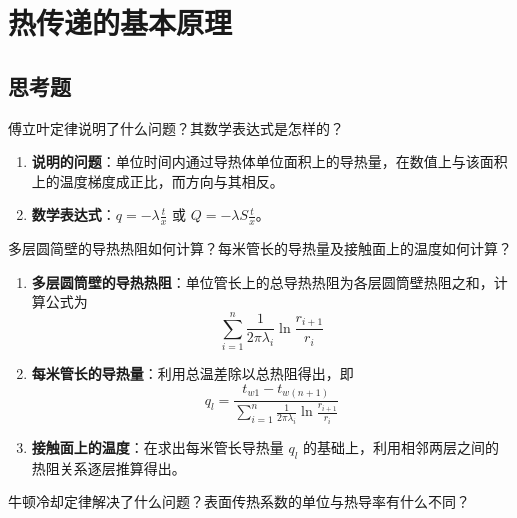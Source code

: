 \chapter{热传递的基本原理}

\section{思考题}

\begin{problem}
傅立叶定律说明了什么问题？其数学表达式是怎样的？
\end{problem}

\begin{solution}
\begin{enumerate}
  \item \textbf{说明的问题}：单位时间内通过导热体单位面积上的导热量，在数值上与该面积上的温度梯度成正比，而方向与其相反。
  \item \textbf{数学表达式}：\(q=-\lambda\frac{t}{x}\) 或 \(Q=-\lambda S\frac{t}{x}\)。
\end{enumerate}
\end{solution}

\begin{problem}
多层圆简壁的导热热阻如何计算？每米管长的导热量及接触面上的温度如何计算？
\end{problem}

\begin{solution}
\begin{enumerate}
  \item \textbf{多层圆筒壁的导热热阻}：单位管长上的总导热热阻为各层圆筒壁热阻之和，计算公式为
  \begin{equation*}
    \sum_{i=1}^{n}\frac{1}{2\pi\lambda_{i}}\ln\frac{r_{i+1}}{r_{i}}
  \end{equation*}
  \item \textbf{每米管长的导热量}：利用总温差除以总热阻得出，即
  \begin{equation*}
    q_{l}=\frac{t_{w1}-t_{w(n+1)}}{\sum_{i=1}^{n}\frac{1}{2\pi\lambda_{i}}\ln\frac{r_{i+1}}{r_{i}}}
  \end{equation*}
  \item \textbf{接触面上的温度}：在求出每米管长导热量 \(q_l\) 的基础上，利用相邻两层之间的热阻关系逐层推算得出。
\end{enumerate}
\end{solution}

\begin{problem}
牛顿冷却定律解决了什么问题？表面传热系数的单位与热导率有什么不同？
\end{problem}

